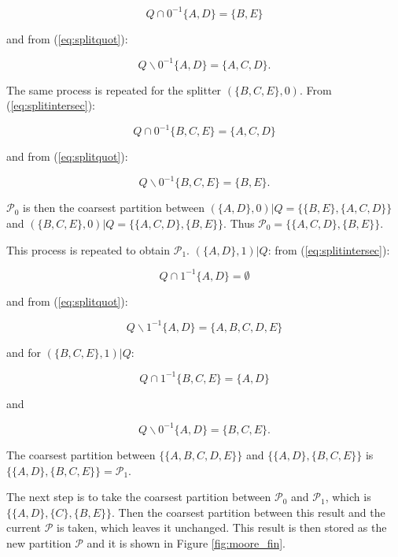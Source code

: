 {\[
Q\cap 0^{-1}\{A,D\} = \{B,E\}
\]

\noindent and from (\ref{eq:splitquot}): 

\[
Q\backslash 0^{-1}\{A,D\} = \{A, C, D\}.
\]

\noindent The same process is repeated for the splitter $(\{B,C,E\},0)$. From (\ref{eq:splitintersec}):

\[
Q\cap 0^{-1}\{B,C,E\} = \{A,C,D\}
\]

\noindent and from  (\ref{eq:splitquot}):

\[
Q\backslash 0^{-1}\{B,C,E\} = \{B,E\}.
\]

\noindent $\mathcal{P}_0$ is then the coarsest partition between $(\{A,D\},0)|Q = \{\{B,E\},\{A,C,D\}\}$ and \linebreak $(\{B,C,E\},0)|Q = \{\{A,C,D\},\{B,E\}\}$. Thus $\mathcal{P}_0 = \{\{A,C,D\},\{B,E\}\}$.

This process is repeated to obtain $\mathcal{P}_1$. $(\{A,D\},1)|Q$: from (\ref{eq:splitintersec}):

\[
Q\cap 1^{-1}\{A,D\} = \emptyset
\]

\noindent and from (\ref{eq:splitquot}):

\[
Q\backslash 1^{-1}\{A,D\} = \{A, B, C, D, E\}
\]

\noindent and for $(\{B,C,E\},1)|Q$: 

\[
Q\cap 1^{-1}\{B,C,E\} = \{A,D\}
\]

\noindent and 

\[
Q\backslash 0^{-1}\{A,D\} = \{B, C, E\}.
\]

\noindent The coarsest partition between $\{\{A,B,C,D,E\}\}$ and \linebreak $\{\{A,D\},\{B,C,E\}\}$ is $\{\{A,D\},\{B,C,E\}\} = \mathcal{P}_1$.

The next step is to take the coarsest partition between $\mathcal{P}_0$ and $\mathcal{P}_1$, which is $\{\{A,D\},\{C\},\{B,E\}\}$. Then the coarsest partition between this result and the current $\mathcal{P}$ is taken, which leaves it unchanged. This result is then stored as the new partition $\mathcal{P}$ and it is shown in Figure \ref{fig:moore_fin}.



}
